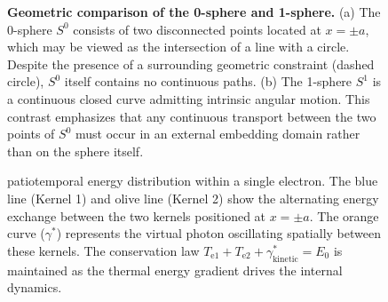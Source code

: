 \documentclass[%
 reprint,
 amsmath,amssymb,
 aps,
 prb,
]{revtex4-2}
\numberwithin{equation}{section}
\begin{document}
\begin{figure}[t!]
    \centering
    \caption{\justifying \textbf{Geometric comparison of the 0-sphere and 1-sphere.}
    (a) The 0-sphere $S^0$ consists of two disconnected points located at $x=\pm a$, which may be viewed as the intersection of a line with a circle.
    Despite the presence of a surrounding geometric constraint (dashed circle), $S^0$ itself contains no continuous paths.
    (b) The 1-sphere $S^1$ is a continuous closed curve admitting intrinsic angular motion.
    This contrast emphasizes that any continuous transport between the two points of $S^0$ must occur in an external embedding domain rather than on the sphere itself.}
    \label{fig:s0_s1_comparison}
\end{figure}

\begin{figure}[t!]
    \centering
    \resizebox{0.95\columnwidth}{!}{%
    }
    \caption{\justifying patiotemporal energy distribution within a single electron. The blue line (Kernel 1) and olive line (Kernel 2) show the alternating energy exchange between the two kernels positioned at $x = \pm a$. The orange curve ($\gamma^*$) represents the virtual photon oscillating spatially between these kernels. The conservation law $T_{\mathrm{e1}} + T_{\mathrm{e2}} + \gamma^*_{\mathrm{kinetic}} = E_0$ is maintained as the thermal energy gradient drives the internal dynamics.
    }
    \label{fig:appendix_virtual_photon}
\end{figure}
\end{document}
